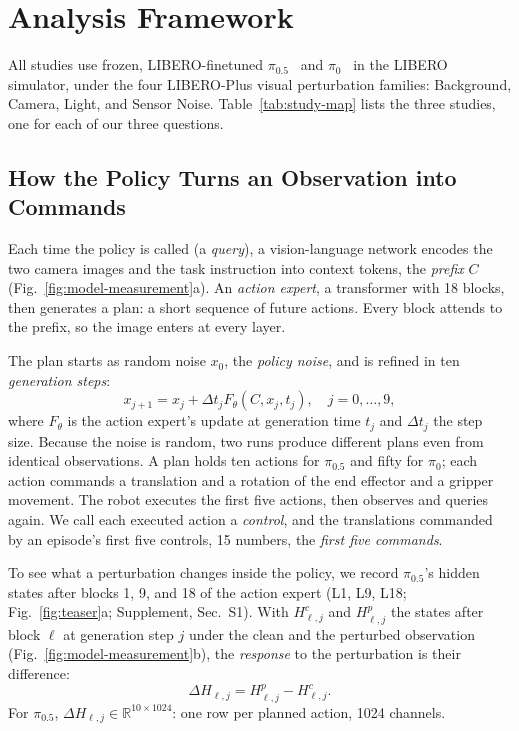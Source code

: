 \section{Analysis Framework}
\label{sec:setup}
All studies use frozen, LIBERO-finetuned $\pi_{0.5}$~\cite{pi05} and $\pi_0$~\cite{pi0} in the LIBERO simulator, under the four LIBERO-Plus visual perturbation families: Background, Camera, Light, and Sensor Noise. Table~\ref{tab:study-map} lists the three studies, one for each of our three questions.



\subsection{How the Policy Turns an Observation into Commands}
\label{sec:generation}
Each time the policy is called (a \emph{query}), a vision-language network encodes the two camera images and the task instruction into context tokens, the \emph{prefix} $C$ (Fig.~\ref{fig:model-measurement}a). An \emph{action expert}, a transformer with 18 blocks, then generates a plan: a short sequence of future actions. Every block attends to the prefix, so the image enters at every layer.

The plan starts as random noise $x_0$, the \emph{policy noise}, and is refined in ten \emph{generation steps}:
\begin{equation}
x_{j+1}=x_j+\Delta t_j F_\theta(C,x_j,t_j),\quad j=0,\ldots,9,
\label{eq:generation}
\end{equation}
where $F_\theta$ is the action expert's update at generation time $t_j$ and $\Delta t_j$ the step size. Because the noise is random, two runs produce different plans even from identical observations. A plan holds ten actions for $\pi_{0.5}$ and fifty for $\pi_0$; each action commands a translation and a rotation of the end effector and a gripper movement. The robot executes the first five actions, then observes and queries again. We call each executed action a \emph{control}, and the translations commanded by an episode's first five controls, 15 numbers, the \emph{first five commands}.

To see what a perturbation changes inside the policy, we record $\pi_{0.5}$'s hidden states after blocks 1, 9, and 18 of the action expert (L1, L9, L18; Fig.~\ref{fig:teaser}a; Supplement, Sec.~S1). With $H^c_{\ell,j}$ and $H^p_{\ell,j}$ the states after block $\ell$ at generation step $j$ under the clean and the perturbed observation (Fig.~\ref{fig:model-measurement}b), the \emph{response} to the perturbation is their difference:
\begin{equation}
\Delta H_{\ell,j}=H^p_{\ell,j}-H^c_{\ell,j}.
\label{eq:response}
\end{equation}
For $\pi_{0.5}$, $\Delta H_{\ell,j}\in\mathbb R^{10\times1024}$: one row per planned action, 1024 channels.

